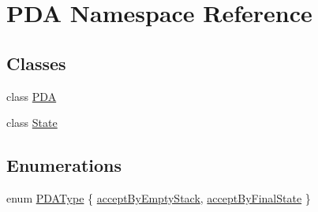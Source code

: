\hypertarget{namespacePDA}{\section{\-P\-D\-A \-Namespace \-Reference}
\label{d7/d11/namespacePDA}
}
\subsection*{\-Classes}
\begin{DoxyCompactItemize}
\item 
class \hyperlink{classPDA_1_1PDA}{\-P\-D\-A}
\item 
class \hyperlink{classPDA_1_1State}{\-State}
\end{DoxyCompactItemize}
\subsection*{\-Enumerations}
\begin{DoxyCompactItemize}
\item 
enum \hyperlink{namespacePDA_a2f2b17cdf30facf6f0fe593ab209acf8}{\-P\-D\-A\-Type} \{ \hyperlink{namespacePDA_a2f2b17cdf30facf6f0fe593ab209acf8abec96ee068d9af07a9bf41137e3b3635}{accept\-By\-Empty\-Stack}, 
\hyperlink{namespacePDA_a2f2b17cdf30facf6f0fe593ab209acf8a68e7e330c1fb2405ce07c4f2600139e1}{accept\-By\-Final\-State}
 \}
\end{DoxyCompactItemize}



